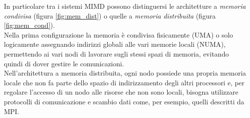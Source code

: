 In particolare tra i sistemi MIMD possono distinguersi le architetture a \emph{memoria condivisa} (figura \ref{fig:mem_dist}) o quelle a \emph{memoria distribuita} (figura \ref{fig:mem_cond}).\\
Nella prima configurazione la memoria è condivisa fisicamente (UMA) o solo logicamente assegnando indirizzi globali alle vari memorie locali (NUMA), permettendo ai vari nodi di lavorare sugli stessi spazi di memoria, evitando quindi di dover gestire le comunicazioni.\\
Nell'architettura a memoria distribuita, ogni nodo possiede una propria memoria locale che non fa parte dello spazio di indirizzamento degli altri processori e, per regolare l'accesso di un nodo alle risorse che non sono locali, bisogna utilizzare protocolli di comunicazione e scambio dati come, per esempio, quelli descritti da MPI.
